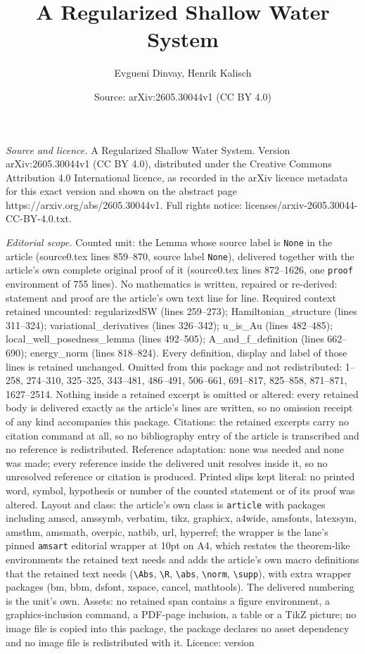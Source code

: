 \documentclass[10pt,a4paper]{amsart}
\title[A Regularized Shallow Water System]{A Regularized Shallow Water System}
\author{Evgueni Dinvay, Henrik Kalisch}
\date{Source: arXiv:2605.30044v1 (CC BY 4.0)}
\begin{document}
\maketitle

\noindent\emph{Source and licence.} A Regularized Shallow Water System. Version arXiv:2605.30044v1 (CC BY 4.0), distributed under the Creative Commons Attribution 4.0 International licence, as recorded in the arXiv licence metadata for this exact version and shown on the abstract page https://arxiv.org/abs/2605.30044v1. Full rights notice: licenses/arxiv-2605.30044-CC-BY-4.0.txt.\par\smallskip

\noindent\textit{Editorial scope.} Counted unit: the Lemma whose source label is \texttt{None} in the article (source0.tex lines 859--870, source label \texttt{None}), delivered together with the article's own complete original proof of it (source0.tex lines 872--1626, one \texttt{proof} environment of 755 lines). No mathematics is written, repaired or re-derived: statement and proof are the article's own text line for line. Required context retained uncounted: regularizedSW (lines 259--273); Hamiltonian\_structure (lines 311--324); variational\_derivatives (lines 326--342); u\_is\_Au (lines 482--485); local\_well\_posedness\_lemma (lines 492--505); A\_and\_f\_definition (lines 662--690); energy\_norm (lines 818--824). Every definition, display and label of those lines is retained unchanged. Omitted from this package and not redistributed: 1--258, 274--310, 325--325, 343--481, 486--491, 506--661, 691--817, 825--858, 871--871, 1627--2514. Nothing inside a retained excerpt is omitted or altered: every retained body is delivered exactly as the article's lines are written, so no omission receipt of any kind accompanies this package. Citations: the retained excerpts carry no citation command at all, so no bibliography entry of the article is transcribed and no reference is redistributed. Reference adaptation: none was needed and none was made; every reference inside the delivered unit resolves inside it, so no unresolved reference or citation is produced. Printed slips kept literal: no printed word, symbol, hypothesis or number of the counted statement or of its proof was altered. Layout and class: the article's own class is \texttt{article} with packages including amscd, amssymb, verbatim, tikz, graphicx, a4wide, amsfonts, latexsym, amsthm, amsmath, overpic, natbib, url, hyperref; the wrapper is the lane's pinned \texttt{amsart} editorial wrapper at 10pt on A4, which restates the theorem-like environments the retained text needs and adds the article's own macro definitions that the retained text needs (\texttt{\textbackslash Abs}, \texttt{\textbackslash R}, \texttt{\textbackslash abs}, \texttt{\textbackslash norm}, \texttt{\textbackslash supp}), with extra wrapper packages (bm, bbm, dsfont, xspace, cancel, mathtools). The delivered numbering is the unit's own. Assets: no retained span contains a figure environment, a graphics-inclusion command, a PDF-page inclusion, a table or a TikZ picture; no image file is copied into this package, the package declares no asset dependency and no image file is redistributed with it. Licence: version 
\end{document}
